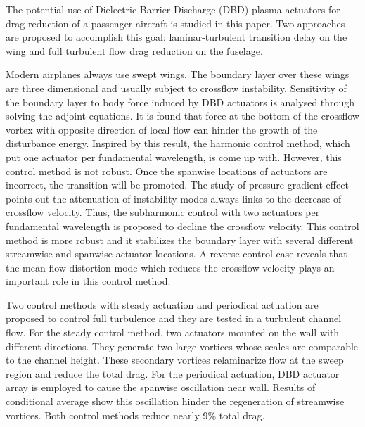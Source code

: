 \begin{eabstract}
   The potential use of Dielectric-Barrier-Discharge (DBD) plasma actuators for drag reduction of a passenger aircraft is studied in this paper. Two approaches are proposed to accomplish this goal: laminar-turbulent transition delay on the wing and full turbulent flow drag reduction on the fuselage.

   Modern airplanes always use swept wings. The boundary layer over these wings are three dimensional and usually subject to crossflow instability. Sensitivity of the boundary layer to body force induced by DBD actuators is analysed through solving the adjoint equations. It is found that force at the bottom of the crossflow vortex with opposite direction of local flow can hinder the growth of the disturbance energy. Inspired by this result, the harmonic control method, which put one actuator per fundamental wavelength, is come up with. However, this control method is not robust. Once the spanwise locations of actuators are incorrect, the transition will be promoted. The study of pressure gradient effect points out the attenuation of instability modes always links to the decrease of crossflow velocity. Thus, the subharmonic control with two actuators per fundamental wavelength is proposed to decline the crossflow velocity. This control method is more robust and it stabilizes the boundary layer with several different streamwise and spanwise actuator locations. A reverse control case reveals that the mean flow distortion mode which reduces the crossflow velocity plays an important role in this control method.

   Two control methods with steady actuation and periodical actuation are proposed to control full turbulence and they are tested in a turbulent channel flow. For the steady control method, two actuators mounted on the wall with different directions. They generate two large vortices whose scales are comparable to the channel height. These secondary vortices relaminarize flow at the sweep region and reduce the total drag. For the periodical actuation, DBD actuator array is employed to cause the spanwise oscillation near wall. Results of conditional average show this oscillation hinder the regeneration of streamwise vortices. Both control methods reduce nearly 9\% total drag.
\end{eabstract}

